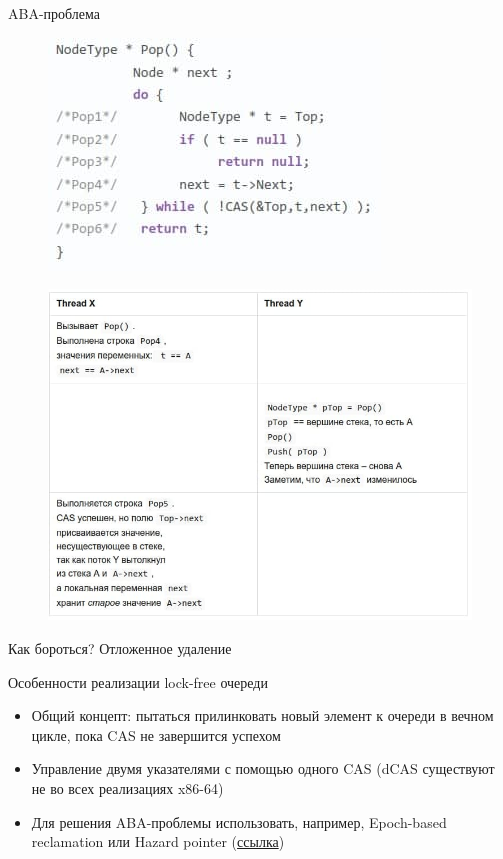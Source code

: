 \documentclass[14pt]{beamer}
\begin{document}
	\begin{frame}{ABA-проблема}
		\begin{minipage}[h]{0.34\linewidth}
			\begin{figure}
				\includegraphics[scale=0.47]{ABA1}
			\end{figure}
		\end{minipage}
		\hfill
		\begin{minipage}[h]{0.64\linewidth}
			\begin{figure}
				\includegraphics[scale=0.45]{ABA2}
			\end{figure}
		\end{minipage}
		Как бороться? Отложенное удаление
	\end{frame}

	\begin{frame}{Особенности реализации lock-free очереди}
		\begin{itemize}
			\item Общий концепт: пытаться прилинковать новый элемент к очереди в вечном цикле, пока CAS не завершится успехом
			\item Управление двумя указателями с помощью одного CAS (dCAS существуют не во всех реализациях x86-64)
			\item Для решения ABA-проблемы использовать, например, Epoch-based reclamation или Hazard pointer (\href{https://habr.com/ru/post/202190/}{ссылка})
		\end{itemize}
	\end{frame}
\end{document}
